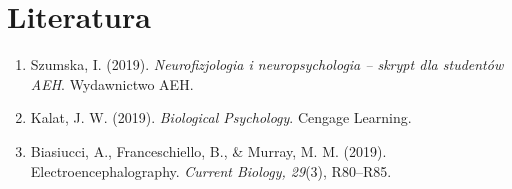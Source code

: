 \documentclass[11pt,a4paper]{article}
\begin{document}
\section{Literatura}
\begin{enumerate}[nosep]
  \item Szumska, I. (2019). \emph{Neurofizjologia i neuropsychologia -- skrypt dla studentów AEH}. Wydawnictwo AEH.
  \item Kalat, J. W. (2019). \emph{Biological Psychology}. Cengage Learning.
  \item Biasiucci, A., Franceschiello, B., \& Murray, M. M. (2019). Electroencephalography. \emph{Current Biology, 29}(3), R80--R85.
\end{enumerate}
\end{document}

